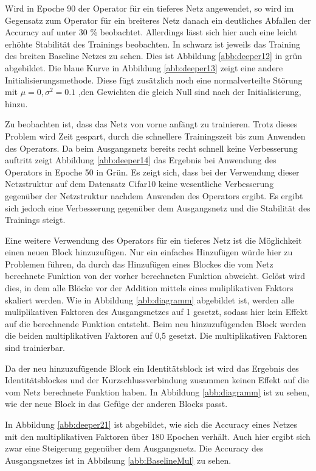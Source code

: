 Wird in Epoche 90 der Operator für ein tieferes Netz angewendet, so wird im Gegensatz zum Operator für ein breiteres Netz danach ein deutliches Abfallen der Accuracy auf unter 30 \% beobachtet. Allerdings lässt sich hier auch eine leicht erhöhte Stabilität des Trainings beobachten. In schwarz ist jeweils das Training des breiten Baseline Netzes zu sehen.  Dies ist Abbildung \ref{abb:deeper12} in grün abgebildet. Die blaue Kurve in Abbildung \ref{abb:deeper13} zeigt eine andere Initialisierungsmethode. Diese fügt zusätzlich noch eine normalverteilte Störung mit $\mu = 0, \sigma^2 = 0.1$ ,den Gewichten die gleich Null sind nach der Initialisierung, hinzu. 

Zu beobachten ist, dass das Netz von vorne anfängt zu trainieren. Trotz dieses Problem wird Zeit gespart, durch die schnellere Trainingszeit bis zum Anwenden des Operators. Da beim Ausgangsnetz bereits recht schnell keine Verbesserung auftritt zeigt Abbildung \ref{abb:deeper14} das Ergebnis bei Anwendung des Operators in Epoche 50 in Grün. 
Es zeigt sich, dass bei der Verwendung dieser Netzstruktur auf dem Datensatz Cifar10 keine wesentliche Verbesserung gegenüber der Netzstruktur nachdem Anwenden des Operators ergibt. Es ergibt sich jedoch eine Verbesserung gegenüber dem Ausgangsnetz und die Stabilität des Trainings steigt.



Eine weitere Verwendung des Operators für ein tieferes Netz ist die Möglichkeit einen neuen Block hinzuzufügen. Nur ein einfaches Hinzufügen würde hier zu Problemen führen, da durch das Hinzufügen eines Blockes die vom Netz berechnete Funktion von der vorher berechneten Funktion abweicht. Gelöst wird dies, in dem alle Blöcke vor der Addition mittels eines muliplikativen Faktors skaliert werden. Wie in Abbildung \ref{abb:diagramm} abgebildet ist, werden alle muliplikativen Faktoren des Ausgangsnetzes auf 1 gesetzt, sodass hier kein Effekt auf die berechnende Funktion entsteht. Beim neu hinzuzufügenden Block werden die beiden multiplikativen Faktoren auf 0,5 gesetzt. Die multiplikativen Faktoren sind trainierbar.

Da der neu hinzuzufügende Block ein Identitätsblock ist wird das Ergebnis des Identitätsblockes und der Kurzschlussverbindung zusammen keinen Effekt auf die vom Netz berechnete Funktion haben. In Abbildung \ref{abb:diagramm} ist zu sehen, wie der neue Block in das Gefüge der anderen Blocks passt.


In Abbildung \ref{abb:deeper21} ist abgebildet, wie sich die Accuracy eines Netzes mit den multiplikativen Faktoren über 180 Epochen verhält. Auch hier ergibt sich zwar eine Steigerung gegenüber dem Ausgangsnetz. Die Accuracy des Ausgangsnetzes ist in Abbilsung \ref{abb:BaselineMul} zu sehen.

